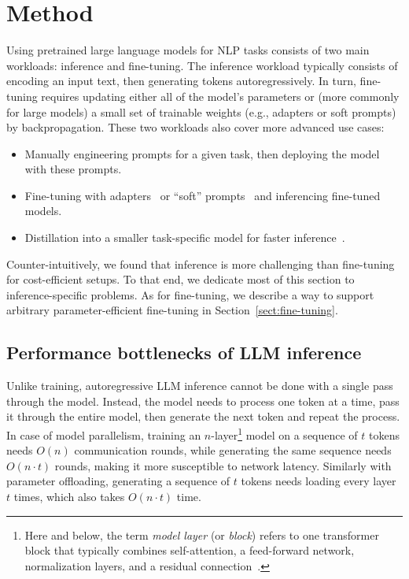 \section{Method}\label{sect:method}

Using pretrained large language models for NLP tasks consists of two main workloads: inference and fine-tuning. The inference workload typically consists of encoding an input text, then generating tokens autoregressively.
In turn, fine-tuning requires updating either all of the model's parameters or (more commonly for large models) a small set of trainable weights (e.g., adapters or soft prompts) by backpropagation. These two workloads also cover more advanced use cases:
\begin{itemize}
    \item Manually engineering prompts for a given task, then deploying the model with these prompts.
    \item Fine-tuning with adapters~\citep{hu2021lora, houlsby2019parameter, tfew} or ``soft'' prompts~\citep{ptune-liu, ptune-lester, ptune-v2} and inferencing fine-tuned models.
    \item Distillation into a smaller task-specific model for faster inference~\citep{schick2021generatingdatasets}\nocite{west2021symbolickd}.
\end{itemize}

Counter-intuitively, we found that inference is more challenging than fine-tuning for cost-efficient setups. To that end, we dedicate most of this section to inference-specific problems. As for fine-tuning, we describe a way to support arbitrary parameter-efficient fine-tuning in Section~\ref{sect:fine-tuning}.

\subsection{Performance bottlenecks of LLM inference}\label{sect:method_analysis}

Unlike training, autoregressive LLM inference cannot be done with a single pass through the model. Instead, the model needs to process one token at a time, pass it through the entire model, then generate the next token and repeat the process. In case of model parallelism, training an $n$-layer\footnote{Here and below, the term \textit{model layer} (or \textit{block}) refers to one transformer block that typically combines self-attention, a feed-forward network, normalization layers, and a residual connection~\citep{transformer}.} model on a sequence of $t$ tokens needs $O(n)$ communication rounds, while generating the same sequence needs $O(n \cdot t)$ rounds, making it more susceptible to network latency. Similarly with parameter offloading, generating a sequence of $t$ tokens needs loading every layer $t$ times, which also takes $O(n \cdot t)$ time.

